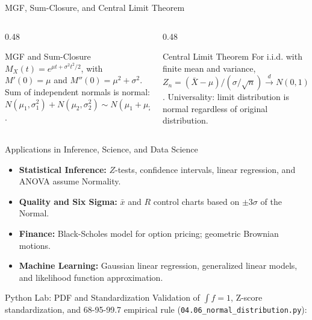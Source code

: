 \documentclass[aspectratio=169,xcolor={dvipsnames,table}]{beamer}
\begin{document}
\begin{frame}{MGF, Sum-Closure, and Central Limit Theorem}
	\vspace{-0.15cm}
	\begin{columns}[T]
		\begin{column}{0.48\textwidth}
			\begin{block}{MGF and Sum-Closure}
				\footnotesize
				$M_{X}(t) = e^{\mu t + \sigma^{2}t^{2}/2}$, with $M'(0)=\mu$ and $M''(0)=\mu^{2}+\sigma^{2}$. Sum of independent normals is normal: $N(\mu_{1}, \sigma_{1}^{2}) + N(\mu_{2}, \sigma_{2}^{2}) \sim N(\mu_{1}+\mu_{2}, \sigma_{1}^{2}+\sigma_{2}^{2})$.
			\end{block}
		\end{column}
		\begin{column}{0.48\textwidth}
			\begin{alertblock}{Central Limit Theorem}
				\footnotesize
				For i.i.d. with finite mean and variance, $Z_{n} = (\bar{X}-\mu)/(\sigma/\sqrt{n}) \xrightarrow{d} N(0,1)$. Universality: limit distribution is normal regardless of original distribution.
			\end{alertblock}
		\end{column}
	\end{columns}
\end{frame}

\begin{frame}{Applications in Inference, Science, and Data Science}
	\vspace{-0.1cm}
	\begin{itemize}\itemsep=0.1cm
		\item \textbf{Statistical Inference:} $Z$-tests, confidence intervals, linear regression, and ANOVA assume Normality. \pause
		\item \textbf{Quality and Six Sigma:} $\bar{x}$ and $R$ control charts based on $\pm 3\sigma$ of the Normal. \pause
		\item \textbf{Finance:} Black-Scholes model for option pricing; geometric Brownian motions. \pause
		\item \textbf{Machine Learning:} Gaussian linear regression, generalized linear models, and likelihood function approximation.
	\end{itemize}
\end{frame}

\begin{frame}[fragile]{Python Lab: PDF and Standardization}
	\vspace{-0.05cm}
	\scriptsize
	Validation of $\int f = 1$, Z-score standardization, and 68-95-99.7 empirical rule (\texttt{04.06\_normal\_distribution.py}):
	\vspace{0.02cm}
	{
	}
\end{frame}
\end{document}
